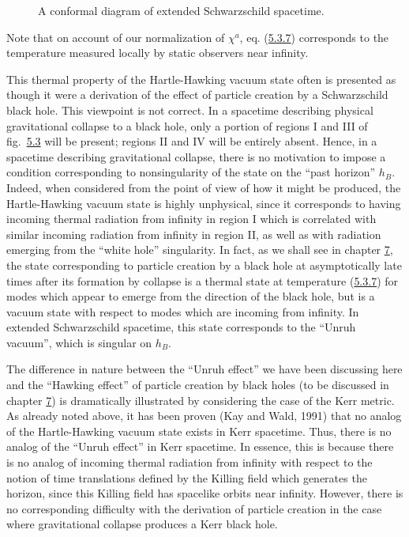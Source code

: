 \documentclass[11pt,a4paper]{article}
\begin{document}
\begin{figure}[htbp]
\centering
\renewcommand{\thefigure}{5.3}

\caption{A conformal diagram of extended Schwarzschild spacetime.}\label{fig:5.3}
\end{figure}

\hypertarget{source-142}{}

Note that on account of our normalization of \(\chi^a\), eq. (\hyperref[eq:5.3.7]{5.3.7}) corresponds to the temperature measured locally by static observers near infinity.

This thermal property of the Hartle-Hawking vacuum state often is presented as though it were a derivation of the effect of particle creation by a Schwarzschild black hole. This viewpoint is not correct. In a spacetime describing physical gravitational collapse to a black hole, only a portion of regions I and III of fig.~\hyperref[fig:5.3]{5.3} will be present; regions II and IV will be entirely absent. Hence, in a spacetime describing gravitational collapse, there is no motivation to impose a condition corresponding to nonsingularity of the state on the ``past horizon'' \(h_B\). Indeed, when considered from the point of view of how it might be produced, the Hartle-Hawking vacuum state is highly unphysical, since it corresponds to having incoming thermal radiation from infinity in region I which is correlated with similar incoming radiation from infinity in region II, as well as with radiation emerging from the ``white hole'' singularity. In fact, as we shall see in chapter \hyperlink{sec:7}{7}, the state corresponding to particle creation by a black hole at asymptotically late times after its formation by collapse is a thermal state at temperature (\hyperref[eq:5.3.7]{5.3.7}) for modes which appear to emerge from the direction of the black hole, but is a vacuum state with respect to modes which are incoming from infinity. In extended Schwarzschild spacetime, this state corresponds to the ``Unruh vacuum'', which is singular on \(h_B\).

The difference in nature between the ``Unruh effect'' we have been discussing here and the ``Hawking effect'' of particle creation by black holes (to be discussed in chapter \hyperlink{sec:7}{7}) is dramatically illustrated by considering the case of the Kerr metric. As already noted above, it has been proven (Kay and Wald, 1991) that no analog of the Hartle-Hawking vacuum state exists in Kerr spacetime. Thus, there is no analog of the ``Unruh effect'' in Kerr spacetime. In essence, this is because there is no analog of incoming thermal radiation from infinity with respect to the notion of time translations defined by the Killing field which generates the horizon, since this Killing field has spacelike orbits near infinity. However, there is no corresponding difficulty with the derivation of particle creation in the case where gravitational collapse produces a Kerr black hole.
\end{document}
